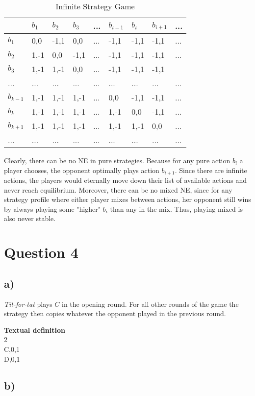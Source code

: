 \documentclass[10pt,a4paper]{article}
\begin{document}
\begin{table}[h]
\centering
\caption{Infinite Strategy Game}
\begin{tabular}{|l|l|l|l|l|l|l|l|l|}
\hline
          & $b_1$ & $b_2$ & $b_3$ & ... & $b_{i-1}$ & $b_{i}$ & $b_{i+1}$ & ... \\ \hline
$b_1$     & 0,0   & -1,1  & 0,0   & ... & -1,1       & -1,1     & -1,1       & ... \\ \hline
$b_2$     & 1,-1  & 0,0   & -1,1  & ... & -1,1       & -1,1     & -1,1      & ... \\ \hline
$b_3$     & 1,-1   & 1,-1  & 0,0   & ... & -1,1       & -1,1     & -1,1       &     \\ \hline
...       & ...   & ...   & ...   & ... & ...       & ...     & ...       & ... \\ \hline
$b_{k-1}$ & 1,-1   & 1,-1   & 1,-1   & ... & 0,0       & -1,1    & -1,1       & ... \\ \hline
$b_{k}$   & 1,-1   & 1,-1   & 1,-1   & ... & 1,-1      & 0,0     & -1,1      & ... \\ \hline
$b_{k+1}$ & 1,-1   & 1,-1   & 1,-1   & ... & 1,-1       & 1,-1    & 0,0       & ... \\ \hline
...       & ...   & ...   & ...   & ... & ...       & ...     & ...       & ... \\ \hline
\end{tabular}
\end{table}

Clearly, there can be no NE in pure strategies. Because for any pure action $b_i$ a player chooses, the opponent optimally plays action $b_{i+1}$. Since there are infinite actions, the players would eternally move down their list of available actions and never reach equilibrium. Moreover, there can be no mixed NE, since for any strategy profile where either player mixes between actions, her opponent still wins by always playing some "higher" $b_i$ than any in the mix. Thus, playing mixed is also never stable.

\section*{Question 4}
\subsection*{a)}
\textit{Tit-for-tat} plays $C$ in the opening round. For all other rounds of the game the strategy then copies whatever the opponent played in the previous round.

\textbf{Textual definition}\\
2\\
C,0,1\\
D,0,1

\subsection*{b)}
\end{document}
